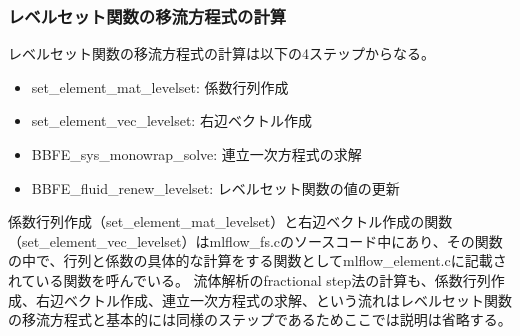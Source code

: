 \documentclass[8pt,a4paper]{article}
\begin{document}
\subsubsection{レベルセット関数の移流方程式の計算}
レベルセット関数の移流方程式の計算は以下の4ステップからなる。
\begin{itemize}
	\item set\_element\_mat\_levelset: 係数行列作成
	\item set\_element\_vec\_levelset: 右辺ベクトル作成
	\item BBFE\_sys\_monowrap\_solve: 連立一次方程式の求解
	\item BBFE\_fluid\_renew\_levelset: レベルセット関数の値の更新
\end{itemize}
係数行列作成（set\_element\_mat\_levelset）と右辺ベクトル作成の関数（set\_element\_vec\_levelset）はmlflow\_fs.cのソースコード中にあり、その関数の中で、行列と係数の具体的な計算をする関数としてmlflow\_element.cに記載されている関数を呼んでいる。
流体解析のfractional step法の計算も、係数行列作成、右辺ベクトル作成、連立一次方程式の求解、という流れはレベルセット関数の移流方程式と基本的には同様のステップであるためここでは説明は省略する。
\end{document}
